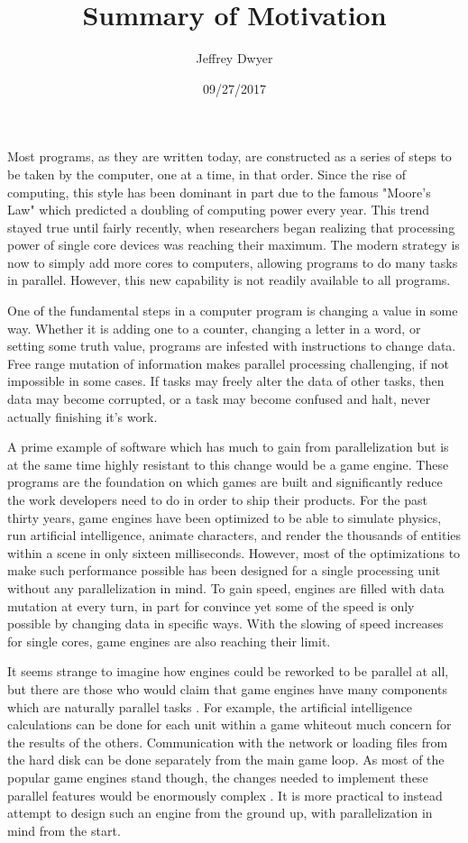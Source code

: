 \documentclass[11pt]{article}
\author{Jeffrey Dwyer}
\date{09/27/2017}
\title{Summary of Motivation}
\begin{document}
\maketitle
Most programs, as they are written today, are constructed as a series of steps to be taken by the computer, one at a time, in that order. Since the rise of computing, this style has been dominant in part due to the famous "Moore's Law" which predicted a doubling of computing power every year. This trend stayed true until fairly recently, when researchers began realizing that processing power of single core devices was reaching their maximum. The modern strategy is now to simply add more cores to computers, allowing programs to do many tasks in parallel. However, this new capability is not readily available to all programs.

One of the fundamental steps in a computer program is changing a value in some way. Whether it is adding one to a counter, changing a letter in a word, or setting some truth value, programs are infested with instructions to change data. Free range mutation of information makes parallel processing challenging, if not impossible in some cases. If tasks may freely alter the data of other tasks, then data may become corrupted, or a task may become confused and halt, never actually finishing it's work.

A prime example of software which has much to gain from parallelization but is at the same time highly resistant to this change would be a game engine. These programs are the foundation on which games are built and significantly reduce the work developers need to do in order to ship their products. For the past thirty years, game engines have been optimized to be able to simulate physics, run artificial intelligence, animate characters, and render the thousands of entities within a scene in only sixteen milliseconds. However, most of the optimizations to make such performance possible has been designed for a single processing unit without any parallelization in mind. To gain speed, engines are filled with data mutation at every turn, in part for convince yet some of the speed is only possible by changing data in specific ways. With the slowing of speed increases for single cores, game engines are also reaching their limit.

It seems strange to imagine how engines could be reworked to be parallel at all, but there are those who would claim that game engines have many components which are naturally parallel tasks \cite{tulip_multi-threaded_2006}. For example, the artificial intelligence calculations can be done for each unit within a game whiteout much concern for the results of the others. Communication with the network or loading files from the hard disk can be done separately from the main game loop. As most of the popular game engines stand though, the changes needed to implement these parallel features would be enormously complex \cite{gajinov_case_2014}. It is more practical to instead attempt to design such an engine from the ground up, with parallelization in mind from the start.
\end{document}
